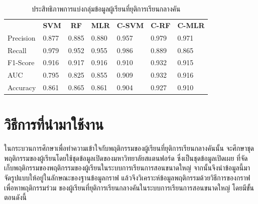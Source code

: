 \documentclass[conference]{IEEEtran}
\def\moocs{การเรียนการสอนขนาดใหญ่}
\def\MOOCs{ระบบ{\moocs}}
\def\dropout{ยุติการเรียนกลางคัน}
\newcommand*{\thead}[1]{\multicolumn{1}{c}{\bfseries #1}}
\begin{document}
    \begin{table}[ht!]
        \caption[clustering-performance]{ประสิทธิภาพการแบ่งกลุ่มข้อมูลผู้เรียนที่{\dropout}}
        \label{tab:clustering-performance}
        \begin{tabular}{p{1.2cm} p{0.7cm}p{0.7cm}p{0.7cm}p{0.7cm}p{0.7cm}p{0.7cm}}
            \hline
             & \thead{SVM} & \thead{RF} & \thead{MLR} & \thead{C-SVM} & \thead{C-RF} & \thead{C-MLR} \\
            Precision   & 0.877 & 0.885 & 0.880 & 0.957 & 0.979 & 0.971 \\
            Recall      & 0.979 & 0.952 & 0.955 & 0.986 & 0.889 & 0.865 \\
            F1-Score    & 0.916 & 0.917 & 0.916 & 0.910 & 0.932 & 0.915 \\
            AUC         & 0.795 & 0.825 & 0.855 & 0.909 & 0.932 & 0.916 \\
            Accuracy    & 0.861 & 0.865 & 0.861 & 0.904 & 0.927 & 0.910 \\
            \hline
        \end{tabular}
    \end{table}

    \section[technicalbackground]{วิธีการที่นำมาใช้งาน}

    ในกระบวนการศึกษาเพื่อทำความเข้าใจกับพฤติกรรมของผู้เรียนที่{\dropout}นั้น
    จะศึกษาชุดพฤติกรรมของผู้เรียนโดยใช้ชุดข้อมูลเปิดของมหาวิทยาลัยสแตนฟอร์ด 
    ซึ่งเป็นชุดข้อมูลเปิดเผย ที่จัดเก็บพฤติกรรมของพฤติกรรมของผู้เรียนใน{\MOOCs}
    จากนั้นจึงนำข้อมูลนี้มาจัดรูปแบบให้อยู่ในลักษณะของฐานข้อมูลกราฟ 
    แล้วจึงวิเคราะห์ข้อมูลพฤติกรรมด้วยวิธีการของกราฟเพื่อหาพฤติกรรมร่วม
    ของผู้เรียนที่{\dropout}ใน{\MOOCs} โดยมีขั้นตอนดังนี้
\end{document}
